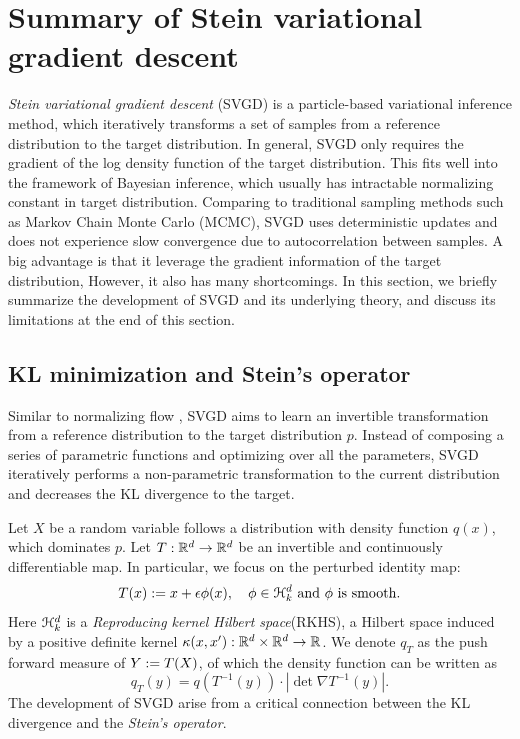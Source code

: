 \section{Summary of Stein variational gradient descent} \label{sec:summary}
\emph{Stein variational gradient descent} (SVGD) \citep{liu2016stein} is a particle-based variational inference method, which iteratively transforms a set of samples from a reference distribution to the target distribution. In general, SVGD only requires the gradient of the log density function of the target distribution. This fits well into the framework of Bayesian inference, which usually has intractable normalizing constant in target distribution.   Comparing to traditional sampling methods such as Markov Chain Monte Carlo (MCMC), SVGD uses deterministic updates and does not experience slow convergence due to autocorrelation between samples. A big advantage is that it leverage the gradient information of the target distribution, However, it also has many shortcomings. In this section, we briefly summarize the development of SVGD  and its underlying theory, and discuss its limitations at the end of this section.



\subsection{KL minimization and Stein's operator}

Similar to normalizing flow \citep{kobyzev2020normalizing}, SVGD aims to learn an invertible transformation from a reference distribution to the target distribution $p$.
Instead of composing a series of parametric functions and optimizing over all the parameters, SVGD iteratively performs a non-parametric transformation to the current distribution and decreases the KL divergence to the target.

Let $X $ be a random variable follows a distribution with density function $q(x)$, which dominates $p$.  Let $T: \mathbb{R}^d \to \mathbb{R}^d$ be an invertible and continuously differentiable map.  In particular, we focus on the perturbed identity map:
\[
    T(x) := x + \epsilon \phi(x) , \quad \phi \in \mathcal{H}_k^d \text{ and } \phi \text{ is smooth}.
\] 
Here $\mathcal{H}_k^d$ is a \emph{Reproducing kernel Hilbert space}(RKHS), a Hilbert space induced by a positive definite kernel $\kappa(x, x'): \mathbb{R}^d\times \mathbb{R}^d \to \mathbb{R}$.  We denote $q_T$ as the push forward measure of $Y := T(X)$, of which the density function can be written as 
\[
q_T(y) = q\left(T^{-1}(y)\right)\cdot \left| \det \nabla T^{-1}(y) \right|.
\]
The development of SVGD arise from a critical connection between the KL divergence and the \emph{Stein's operator}. 

